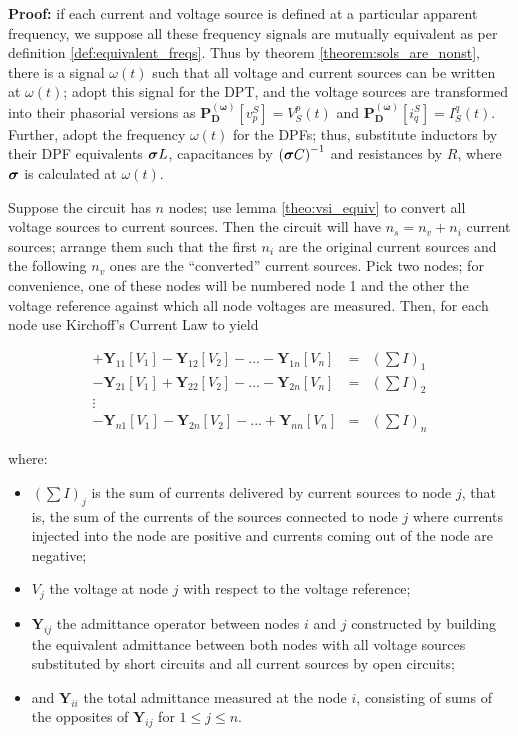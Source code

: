\textbf{Proof:} if each current and voltage source is defined at a particular apparent frequency, we suppose all these frequency signals are mutually equivalent as per definition \ref{def:equivalent_freqs}. Thus by theorem \ref{theorem:sols_are_nonst}, there is a signal $\omega(t)$ such that all voltage and current sources can be written at $\omega(t)$; adopt this signal for the DPT, and the voltage sources are transformed into their phasorial versions as $\mathbf{P_D^{\left(\omega\right)}}\left[v^S_p\right] = V_S^p(t)$ and $\mathbf{P_D^{\left(\omega\right)}}\left[i^S_q\right] = I_S^q(t)$. Further, adopt the frequency $\omega(t)$ for the DPFs; thus, substitute inductors by their DPF equivalents $\boldsymbol{\sigma} L$, capacitances by $\left(\boldsymbol{\sigma} C\right)^{-1}$ and resistances by $R$, where $\boldsymbol{\sigma}$ is calculated at $\omega(t)$.

	Suppose the circuit has $n$ nodes; use lemma \ref{theo:vsi_equiv} to convert all voltage sources to current sources. Then the circuit will have $n_s = n_v + n_i$ current sources; arrange them such that the first $n_i$ are the original current sources and the following $n_v$ ones are the ``converted'' current sources. Pick two nodes; for convenience, one of these nodes will be numbered node 1 and the other the voltage reference against which all node voltages are measured. Then, for each node use Kirchoff's Current Law to yield

\begin{equation}
	\begin{array}{ccc} + \mathbf{Y}_{11} \left[V_1\right] - \mathbf{Y}_{12} \left[V_2\right] - ... - \mathbf{Y}_{1n} \left[V_n\right] &=& \left(\sum I\right)_1 \\[1mm] - \mathbf{Y}_{21} \left[V_1\right] + \mathbf{Y}_{22} \left[V_2\right] - ... - \mathbf{Y}_{2n} \left[V_n\right] &=& \left(\sum I\right)_2 \\ \vdots \\ - \mathbf{Y}_{n1} \left[V_1\right] - \mathbf{Y}_{2n} \left[V_2\right] - ... + \mathbf{Y}_{nn} \left[V_n\right] &=& \left(\sum I\right)_n \end{array} \label{eq:superptheo_nodes}
\end{equation}

	\noindent where:

\begin{itemize}
	\item $\left(\sum I\right)_j$ is the sum of currents delivered by current sources to node $j$, that is, the sum of the currents of the sources connected to node $j$ where currents injected into the node are positive and currents coming out of the node are negative;
	\item $V_j$ the voltage at node $j$ with respect to the voltage reference;
	\item $\mathbf{Y}_{ij}$ the admittance operator between nodes $i$ and $j$ constructed by building the equivalent admittance between both nodes with all voltage sources substituted by short circuits and all current sources by open circuits;
	\item and $\mathbf{Y}_{ii}$ the total admittance measured at the node $i$, consisting of sums of the opposites of $\mathbf{Y}_{ij}$ for $1\leq j \leq n$.
\end{itemize}

